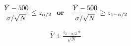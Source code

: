 \documentclass[12pt]{article}
\begin{document}
\pagestyle{empty}
\Large
{}
\pagecolor{ehandbook}

\boldmath
\begin{eqnarray*}
\frac{\bar{Y}-500}{\sigma / \sqrt{N}} \le z_{\alpha/2} \mbox{\bf \,\, or \,\, }
\frac{\bar{Y}-500}{\sigma / \sqrt{N}} \ge z_{1-\alpha/2}
\end{eqnarray*}

\vspace*{.25in}
\begin{eqnarray*}
\bar{Y} \pm \frac{z_{1-\alpha/2} \, \sigma}{\sqrt{N}}
\end{eqnarray*}
\end{document}
